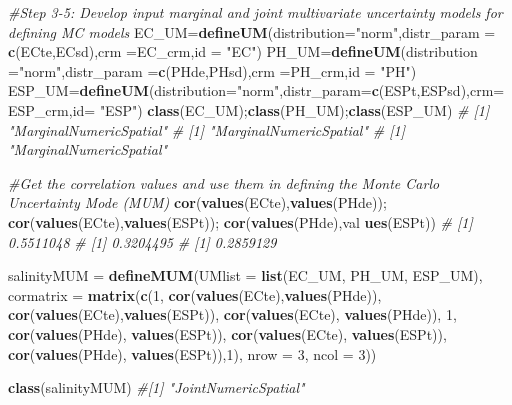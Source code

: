 \documentclass[
  10pt,
  b5paper,
]{book}
\newenvironment{Shaded}{\begin{snugshade}}{\end{snugshade}}
\newcommand{\CommentTok}[1]{\textcolor[rgb]{0.56,0.35,0.01}{\textit{#1}}}
\newcommand{\DataTypeTok}[1]{\textcolor[rgb]{0.13,0.29,0.53}{#1}}
\newcommand{\DecValTok}[1]{\textcolor[rgb]{0.00,0.00,0.81}{#1}}
\newcommand{\KeywordTok}[1]{\textcolor[rgb]{0.13,0.29,0.53}{\textbf{#1}}}
\newcommand{\NormalTok}[1]{#1}
\newcommand{\StringTok}[1]{\textcolor[rgb]{0.31,0.60,0.02}{#1}}
\begin{document}
\begin{Shaded}
\begin{Highlighting}[]
\CommentTok{#Step 3-5: Develop input marginal and joint multivariate uncertainty models for defining MC models}
\NormalTok{EC_UM=}\KeywordTok{defineUM}\NormalTok{(}\DataTypeTok{distribution=}\StringTok{"norm"}\NormalTok{,}\DataTypeTok{distr_param =} \KeywordTok{c}\NormalTok{(ECte,ECsd),}\DataTypeTok{crm =}\NormalTok{EC_crm,}\DataTypeTok{id =} \StringTok{"EC"}\NormalTok{)}
\NormalTok{PH_UM=}\KeywordTok{defineUM}\NormalTok{(}\DataTypeTok{distribution =}\StringTok{"norm"}\NormalTok{,}\DataTypeTok{distr_param =}\KeywordTok{c}\NormalTok{(PHde,PHsd),}\DataTypeTok{crm =}\NormalTok{PH_crm,}\DataTypeTok{id =} \StringTok{"PH"}\NormalTok{)}
\NormalTok{ESP_UM=}\KeywordTok{defineUM}\NormalTok{(}\DataTypeTok{distribution=}\StringTok{"norm"}\NormalTok{,}\DataTypeTok{distr_param=}\KeywordTok{c}\NormalTok{(ESPt,ESPsd),}\DataTypeTok{crm=}\NormalTok{ESP_crm,}\DataTypeTok{id=} \StringTok{"ESP"}\NormalTok{)}
\KeywordTok{class}\NormalTok{(EC_UM);}\KeywordTok{class}\NormalTok{(PH_UM);}\KeywordTok{class}\NormalTok{(ESP_UM)}
\CommentTok{# [1] "MarginalNumericSpatial"}
\CommentTok{# [1] "MarginalNumericSpatial"}
\CommentTok{# [1] "MarginalNumericSpatial"}


\CommentTok{#Get the correlation values and use them in defining the Monte Carlo Uncertainty Mode (MUM)}
\KeywordTok{cor}\NormalTok{(}\KeywordTok{values}\NormalTok{(ECte),}\KeywordTok{values}\NormalTok{(PHde)); }\KeywordTok{cor}\NormalTok{(}\KeywordTok{values}\NormalTok{(ECte),}\KeywordTok{values}\NormalTok{(ESPt)); }\KeywordTok{cor}\NormalTok{(}\KeywordTok{values}\NormalTok{(PHde),val }\KeywordTok{ues}\NormalTok{(ESPt))}
\CommentTok{# [1] 0.5511048}
\CommentTok{# [1] 0.3204495}
\CommentTok{# [1] 0.2859129}

\NormalTok{		salinityMUM =}\StringTok{ }\KeywordTok{defineMUM}\NormalTok{(}\DataTypeTok{UMlist =} \KeywordTok{list}\NormalTok{(EC_UM, PH_UM, ESP_UM), }\DataTypeTok{cormatrix =} \KeywordTok{matrix}\NormalTok{(}\KeywordTok{c}\NormalTok{(}\DecValTok{1}\NormalTok{, }\KeywordTok{cor}\NormalTok{(}\KeywordTok{values}\NormalTok{(ECte),}\KeywordTok{values}\NormalTok{(PHde)), }\KeywordTok{cor}\NormalTok{(}\KeywordTok{values}\NormalTok{(ECte),}\KeywordTok{values}\NormalTok{(ESPt)), }\KeywordTok{cor}\NormalTok{(}\KeywordTok{values}\NormalTok{(ECte), }\KeywordTok{values}\NormalTok{(PHde)), }\DecValTok{1}\NormalTok{, }\KeywordTok{cor}\NormalTok{(}\KeywordTok{values}\NormalTok{(PHde), }\KeywordTok{values}\NormalTok{(ESPt)), }\KeywordTok{cor}\NormalTok{(}\KeywordTok{values}\NormalTok{(ECte), }\KeywordTok{values}\NormalTok{(ESPt)), }\KeywordTok{cor}\NormalTok{(}\KeywordTok{values}\NormalTok{(PHde), }\KeywordTok{values}\NormalTok{(ESPt)),}\DecValTok{1}\NormalTok{), }\DataTypeTok{nrow =} \DecValTok{3}\NormalTok{, }\DataTypeTok{ncol =} \DecValTok{3}\NormalTok{))}

	\KeywordTok{class}\NormalTok{(salinityMUM)}
\CommentTok{#[1] "JointNumericSpatial"}
\end{Highlighting}
\end{Shaded}
\end{document}
